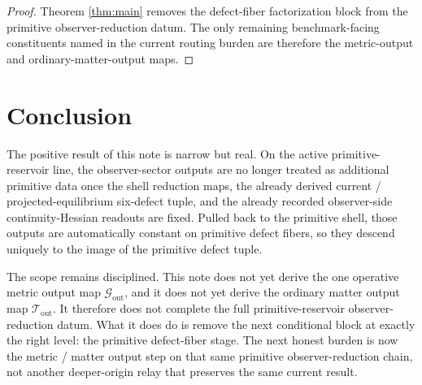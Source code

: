 \documentclass[11pt]{article}
\newcommand{\MetricOut}{\mathscr G_{\mathrm{out}}}
\newcommand{\MatterOut}{\mathscr T_{\mathrm{out}}}
\begin{document}
\begin{proof}
Theorem \ref{thm:main} removes the defect-fiber factorization block from the primitive observer-reduction datum. The only remaining benchmark-facing constituents named in the current routing burden are therefore the metric-output and ordinary-matter-output maps.
\end{proof}

\section{Conclusion}

The positive result of this note is narrow but real. On the active primitive-reservoir line, the observer-sector outputs are no longer treated as additional primitive data once the shell reduction maps, the already derived current / projected-equilibrium six-defect tuple, and the already recorded observer-side continuity-Hessian readouts are fixed. Pulled back to the primitive shell, those outputs are automatically constant on primitive defect fibers, so they descend uniquely to the image of the primitive defect tuple.

The scope remains disciplined. This note does not yet derive the one operative metric output map \(\MetricOut\), and it does not yet derive the ordinary matter output map \(\MatterOut\). It therefore does not complete the full primitive-reservoir observer-reduction datum. What it does do is remove the next conditional block at exactly the right level: the primitive defect-fiber stage. The next honest burden is now the metric / matter output step on that same primitive observer-reduction chain, not another deeper-origin relay that preserves the same current result.
\end{document}
